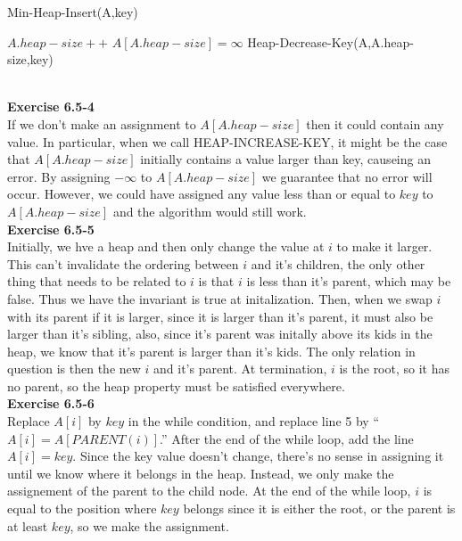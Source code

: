 \documentclass{article}
\begin{document}
Min-Heap-Insert(A,key)
\begin{algorithm}
\begin{algorithmic}[1]
\State $A.heap-size ++$
\State $A[A.heap-size] = \infty$
\State Heap-Decrease-Key(A,A.heap-size,key)
\end{algorithmic}
\end{algorithm}\\

\noindent\textbf{Exercise 6.5-4}\\

If we don't make an assignment to $A[A.heap-size]$ then it could contain any value. In particular, when we call HEAP-INCREASE-KEY, it might be the case that $A[A.heap-size]$ initially contains a value larger than key, causeing an error.  By assigning $-\infty$ to $A[A.heap-size]$ we guarantee that no error will occur.  However, we could have assigned any value less than or equal to $key$ to $A[A.heap-size]$ and the algorithm would still work. \\

\noindent\textbf{Exercise 6.5-5}\\

Initially, we hve a heap and then only change the value at $i$ to make it larger. This can't invalidate the ordering between $i$ and it's children, the only other thing that needs to be related to $i$ is that $i$ is less than it's parent, which may be false. Thus we have the invariant is true at initalization. Then, when we swap $i$ with its parent if it is larger, since it is larger than it's parent, it must also be larger than it's sibling, also, since it's parent was initally above its kids in the heap, we know that it's parent is larger than it's kids. The only relation in question is then the new $i$ and it's parent. At termination, $i$ is the root, so it has no parent, so the heap property must be satisfied everywhere.\\

\noindent\textbf{Exercise 6.5-6}\\

Replace $A[i]$ by $key$ in the while condition, and replace line 5 by ``$A[i] = A[PARENT(i)]$.''  After the end of the while loop, add the line $A[i] = key$.  Since the key value doesn't change, there's no sense in assigning it until we know where it belongs in the heap.  Instead, we only make the assignement of the parent to the child node.  At the end of the while loop, $i$ is equal to the position where $key$ belongs since it is either the root, or the parent is at least $key$, so we make the assignment. \\
\end{document}
